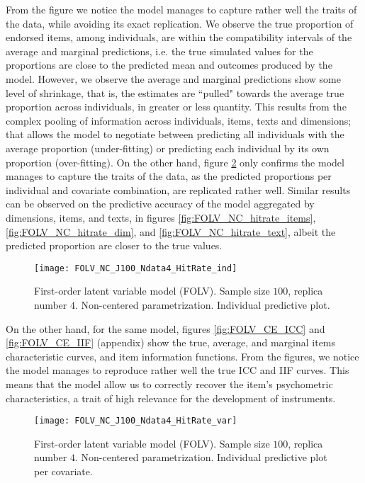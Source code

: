 From the figure we notice the model manages to capture rather well the traits of the data, while avoiding its exact replication. We observe the true proportion of endorsed items, among individuals, are within the compatibility intervals of the average and marginal predictions, i.e. the true simulated values for the proportions are close to the predicted mean and outcomes produced by the model. However, we observe the average and marginal predictions show some level of shrinkage, that is, the estimates are ``pulled" towards the average true proportion across individuals, in greater or less quantity. This results from the complex pooling of information across individuals, items, texts and dimensions; that allows the model to negotiate between predicting all individuals with the average proportion (under-fitting) or predicting each individual by its own proportion (over-fitting). On the other hand, figure \ref{fig:FOLV_NC_hitrate_var} only confirms the model manages to capture the traits of the data, as the predicted proportions per individual and covariate combination, are replicated rather well. Similar results can be observed on the predictive accuracy of the model aggregated by dimensions, items, and texts, in figures \ref{fig:FOLV_NC_hitrate_items}, \ref{fig:FOLV_NC_hitrate_dim}, and \ref{fig:FOLV_NC_hitrate_text}, albeit the predicted proportion are closer to the true values.
%
\begin{figure}[H]
	\centering
	\texttt{[image: FOLV\_NC\_J100\_Ndata4\_HitRate\_ind]}
	\caption[First-order latent variable model (FOLV). Sample size $100$, replica number $4$. Non-centered parametrization. Individual predictive plot.]%
	{First-order latent variable model (FOLV). Sample size $100$, replica number $4$. Non-centered parametrization. Individual predictive plot.}
	\label{fig:FOLV_NC_hitrate_ind}
\end{figure}

On the other hand, for the same model, figures \ref{fig:FOLV_CE_ICC} and \ref{fig:FOLV_CE_IIF} (appendix) show the true, average, and marginal items characteristic curves, and item information functions. From the figures, we notice the model manages to reproduce rather well the true ICC and IIF curves. This means that the model allow us to correctly recover the item's psychometric characteristics, a trait of high relevance for the development of instruments.
%
\begin{figure}[H]
	\centering
	\texttt{[image: FOLV\_NC\_J100\_Ndata4\_HitRate\_var]}
	\caption[First-order latent variable model (FOLV). Sample size $100$, replica number $4$. Non-centered parametrization. Individual predictive plot per covariate.]%
	{First-order latent variable model (FOLV). Sample size $100$, replica number $4$. Non-centered parametrization. Individual predictive plot per covariate.}
	\label{fig:FOLV_NC_hitrate_var}
\end{figure}

